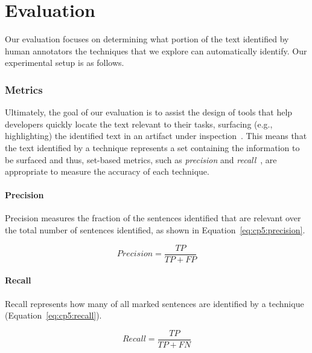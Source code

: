 \section{Evaluation}
\label{cp5:evaluation}


Our evaluation focuses 
on determining what portion of the text identified by human annotators the techniques that we explore can automatically identify.
Our experimental setup is as follows.



\subsubsection{Metrics}


Ultimately, the goal of our evaluation is to assist the design of tools that help developers quickly locate the text relevant to their tasks, surfacing (e.g., highlighting) the identified text in an artifact under inspection~\cite{Robillard2015}.
This means that the text identified by a technique represents a set containing the information to be surfaced and thus, 
set-based metrics, such as \textit{precision} and \textit{recall}~\cite{Manning2009IR}, are appropriate to measure the accuracy of each technique.





\paragraph{\textbf{Precision}}

Precision measures the fraction of the sentences identified that are relevant over the total number of sentences identified, as shown in Equation~\ref{eq:cp5:precision}.



\begin{equation}
\label{eq:cp5:precision}    
    Precision = \frac{TP}{TP + FP}
\end{equation}


\paragraph{\textbf{Recall}} Recall represents how many of all marked sentences are identified by a technique (Equation~\ref{eq:cp5:recall}).


\begin{equation}
\label{eq:cp5:recall}        
    Recall = \frac{TP}{TP + FN}
\end{equation}



